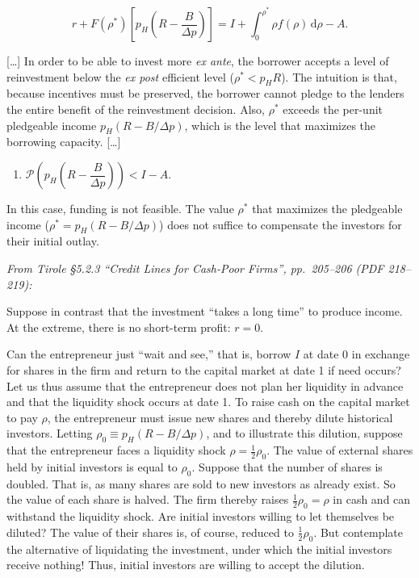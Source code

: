 \documentclass[11pt,a4paper]{article}
\providecommand{\tightlist}{\setlength{\itemsep}{0pt}\setlength{\parskip}{0pt}}
\begin{document}
\[r + F(\rho^*)\left[p_H\left(R - \frac{B}{\Delta p}\right)\right] = I + \int_0^{\rho^*}\rho f(\rho)\,\mathrm{d}\rho - A.\]

{[}\ldots{]} In order to be able to invest more \emph{ex ante}, the borrower accepts a level of
reinvestment below the \emph{ex post} efficient level (\(\rho^* < p_HR\)). The intuition is that,
because incentives must be preserved, the borrower cannot pledge to the lenders the entire benefit
of the reinvestment decision. Also, \(\rho^*\) exceeds the per-unit pledgeable income
\(p_H(R - B/\Delta p)\), which is the level that maximizes the borrowing capacity. {[}\ldots{]}

\begin{enumerate}
\def\labelenumi{(\roman{enumi})}
\setcounter{enumi}{2}
\tightlist
\item
  \(\mathcal{P}\left(p_H\left(R - \dfrac{B}{\Delta p}\right)\right) < I - A\).
\end{enumerate}

In this case, funding is not feasible. The value \(\rho^*\) that maximizes the pledgeable income
(\(\rho^* = p_H(R - B/\Delta p)\)) does not suffice to compensate the investors for their initial
outlay.

\emph{From Tirole §5.2.3 ``Credit Lines for Cash-Poor Firms'', pp.~205--206 (PDF 218--219):}

Suppose in contrast that the investment ``takes a long time'' to produce income. At the extreme,
there is no short-term profit: \(r = 0\).

Can the entrepreneur just ``wait and see,'' that is, borrow \(I\) at date 0 in exchange for shares
in the firm and return to the capital market at date 1 if need occurs? Let us thus assume that the
entrepreneur does not plan her liquidity in advance and that the liquidity shock occurs at date 1.
To raise cash on the capital market to pay \(\rho\), the entrepreneur must issue new shares and
thereby dilute historical investors. Letting \(\rho_0 \equiv p_H(R - B/\Delta p)\), and to
illustrate this dilution, suppose that the entrepreneur faces a liquidity shock
\(\rho = \frac12\rho_0\). The value of external shares held by initial investors is equal to
\(\rho_0\). Suppose that the number of shares is doubled. That is, as many shares are sold to new
investors as already exist. So the value of each share is halved. The firm thereby raises
\(\frac12\rho_0 = \rho\) in cash and can withstand the liquidity shock. Are initial investors
willing to let themselves be diluted? The value of their shares is, of course, reduced to
\(\frac12\rho_0\). But contemplate the alternative of liquidating the investment, under which the
initial investors receive nothing! Thus, initial investors are willing to accept the dilution.
\end{document}

